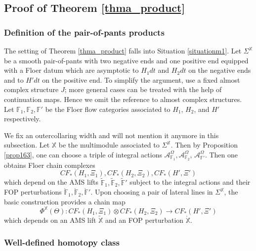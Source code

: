 \documentclass[reqno, 10pt]{amsart}
\numberwithin{equation}{section}
\numberwithin{equation}{section}
\theoremstyle{definition}
\theoremstyle{remark}
\newcommand{\beqn}{\begin{equation*}}
\newcommand{\eeqn}{\end{equation*}}
\newcommand{\mb}{\mathbb}
\newcommand{\mc}{\mathcal}
\begin{document}
\subsection{Proof of Theorem \ref{thma_product}}\label{subsection_proof_product}

\subsubsection{Definition of the pair-of-pants products}

The setting of Theorem \ref{thma_product} falls into Situation \ref{situationm1}. Let $\Sigma^{\mb X}$ be a smooth pair-of-pants with two negative ends and one positive end equipped with a Floer datum which are asymptotic to $H_1dt$ and $H_2dt$ on the negative ends and to $H'dt$ on the positive end. To simplify the argument, use a fixed almost complex structure $J$; more general cases can be treated with the help of continuation maps. Hence we omit the reference to almost complex structures. Let ${\mb F}_1, {\mb F}_2, {\mb F}'$ be the Floer flow categories associated to $H_1$, $H_2$, and $H'$ respectively.

We fix an outercollaring width and will not mention it anymore in this subsection. Let ${\mb X}$ be the multimodule associated to $\Sigma^{\mb X}$. Then by Proposition \ref{prop163}, one can choose a triple of integral actions ${\mc A}_{{\mb F}_1}^\Omega, {\mc A}_{{\mb F}_2}^\Omega$, ${\mc A}_{{\mb F}'}^\Omega$. Then one obtains Floer chain complexes 
\beqn
CF_*(H_1, \Xi_1), CF_*(H_2, \Xi_2), CF_*(H', \Xi')
\eeqn
which depend on the AMS lifts $\tilde {\mb F}_1, \tilde {\mb F}_2, \tilde {\mb F}'$ subject to the integral actions and their FOP perturbations $\mathring {\mb F}_1, \mathring {\mb F}_2, \mathring {\mb F}'$. Upon choosing a pair of lateral lines in $\Sigma^{\mb X}$, the basic construction provides a chain map
\beqn
\Phi^{\mb X}(\Theta): CF_*(H_1, \Xi_1) \otimes CF_*(H_2, \Xi_2) \to CF_*(H', \Xi')
\eeqn
which depends on an AMS lift $\tilde {\mb X}$ and an FOP perturbation $\mathring {\mb X}$. 

\subsubsection{Well-defined homotopy class}
\end{document}
